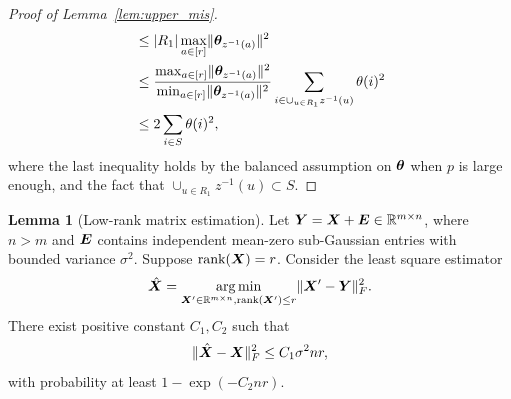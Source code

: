 \documentclass[journal]{IEEEtran}
\theoremstyle{definition}
\newtheorem{lem}{Lemma}
\theoremstyle{definition}
\begin{document}
\begin{proof}[Proof of Lemma~\ref{lem:upper_mis}]
\begin{align}
    & \leq |R_1| \max_{a \in [r]} \lVert\boldsymbol{\theta}_{z^{-1}(a)}\rVert^2  \\
    & \leq {\max_{a \in [r]} \lVert\boldsymbol{\theta}_{z^{-1}(a)}\rVert^2 \over \min_{a \in [r]} \lVert\boldsymbol{\theta}_{z^{-1}(a)}\rVert^2 } \sum_{i \in \cup_{u \in R_1} z^{-1}(u)} \theta(i)^2\\
    & \leq 2 \sum_{i \in S} \theta(i)^2,
\end{align}
where the last inequality holds by the balanced assumption on $\boldsymbol{\theta}$ when $p$ is large enough, and the fact that $ \cup_{u \in R_1} z^{-1}(u) \subset S$.
\end{proof}

\begin{lem}[Low-rank matrix estimation] \label{lem:lowrank} Let $\bm Y = \bm X + \bm{E} \in \mathbb{R}^{m \times n}$, where {$n > m$ and} $\bm{E}$ contains independent mean-zero sub-Gaussian entries with bounded variance $\sigma^2$. Suppose $\text{rank}(\bm X) = r$. Consider the least square estimator 
        \begin{equation}
            \hat {\bm X} = \operatorname*{arg\,min}_{\bm X' \in \mathbb{R}^{m \times n}, \text{rank}(\bm X') \leq r} \lVert\bm X' - \bm Y\rVert_F^2.
        \end{equation}
        There exist positive constant $C_1, C_2$ such that
        \begin{equation}
            \lVert\hat {\bm X} - \bm X\rVert_F^2 \leq C_1 \sigma^2 nr,
        \end{equation}
        with probability at least $1 - \exp(-C_2 nr)$.

        \end{lem}
\end{document}
